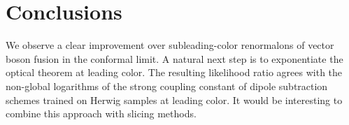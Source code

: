 \section{Conclusions}\label{sec:conclusions}

We observe a clear improvement over subleading-color renormalons of
vector boson fusion in the conformal limit. A natural next step is to
exponentiate the optical theorem at leading color. The resulting
likelihood ratio agrees with the non-global logarithms of the strong
coupling constant of dipole subtraction schemes trained on Herwig
samples at leading color. It would be interesting to combine this
approach with slicing methods.

